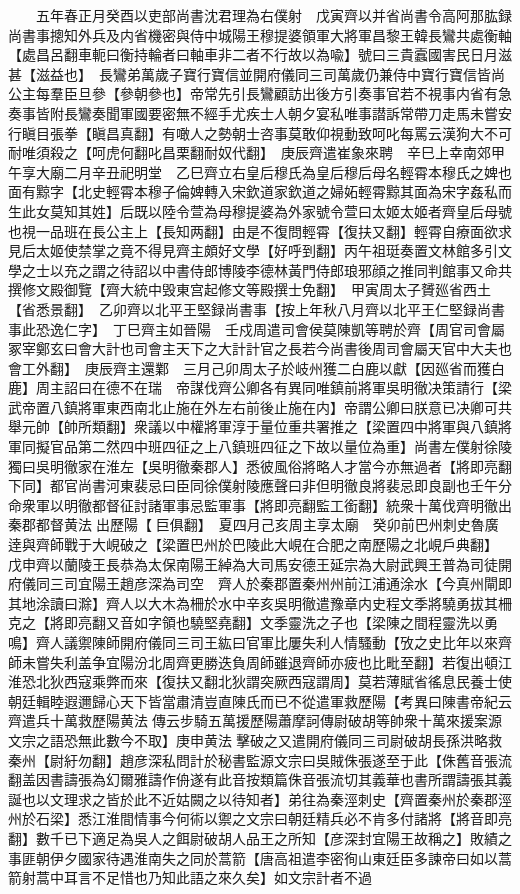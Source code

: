 　　五年春正月癸酉以吏部尚書沈君理為右僕射　戊寅齊以并省尚書令高阿那肱録尚書事摠知外兵及内省機密與侍中城陽王穆提婆領軍大將軍昌黎王韓長鸞共處衡軸【處昌呂翻車軛曰衡持輪者曰軸車非二者不行故以為喩】號曰三貴蠧國害民日月滋甚【滋益也】　長鸞弟萬歲子寶行寶信並開府儀同三司萬歲仍兼侍中寶行寶信皆尚公主每羣臣旦參【參朝參也】帝常先引長鸞顧訪出後方引奏事官若不視事内省有急奏事皆附長鸞奏聞軍國要密無不經手尤疾士人朝夕宴私唯事譛訴常帶刀走馬未嘗安行瞋目張拳【瞋昌真翻】有噉人之勢朝士咨事莫敢仰視動致呵叱每罵云漢狗大不可耐唯須殺之【呵虎何翻叱昌栗翻耐奴代翻】　庚辰齊遣崔象來聘　辛巳上幸南郊甲午享大廟二月辛丑祀明堂　乙巳齊立右皇后穆氏為皇后穆后母名輕霄本穆氏之婢也面有黥字【北史輕霄本穆子倫婢轉入宋欽道家欽道之婦妬輕霄黥其面為宋字姦私而生此女莫知其姓】后既以陸令萱為母穆提婆為外家號令萱曰太姬太姬者齊皇后母號也視一品班在長公主上【長知两翻】由是不復問輕霄【復扶又翻】輕霄自療面欲求見后太姬使禁掌之竟不得見齊主頗好文學【好呼到翻】丙午祖珽奏置文林館多引文學之士以充之謂之待詔以中書侍郎博陵李德林黃門侍郎琅邪顔之推同判館事又命共撰修文殿御覽【齊大統中毁東宫起修文等殿撰士免翻】　甲寅周太子贇廵省西土【省悉景翻】　乙卯齊以北平王堅録尚書事【按上年秋八月齊以北平王仁堅録尚書事此恐逸仁字】　丁巳齊主如晉陽　壬戍周遣司會侯莫陳凱等聘於齊【周官司會屬冢宰鄭玄曰會大計也司會主天下之大計計官之長若今尚書後周司會屬天官中大夫也會工外翻】　庚辰齊主還鄴　三月己卯周太子於岐州獲二白鹿以獻【因廵省而獲白鹿】周主詔曰在德不在瑞　帝謀伐齊公卿各有異同唯鎮前將軍吳明徹决策請行【梁武帝置八鎮將軍東西南北止施在外左右前後止施在内】帝謂公卿曰朕意已决卿可共舉元帥【帥所類翻】衆議以中權將軍淳于量位重共署推之【梁置四中將軍與八鎮將軍同擬官品第二然四中班四征之上八鎮班四征之下故以量位為重】尚書左僕射徐陵獨曰吳明徹家在淮左【吳明徹秦郡人】悉彼風俗將略人才當今亦無過者【將即亮翻下同】都官尚書河東裴忌曰臣同徐僕射陵應聲曰非但明徹良將裴忌即良副也壬午分命衆軍以明徹都督征討諸軍事忌監軍事【將即亮翻監工銜翻】統衆十萬伐齊明徹出秦郡都督黄法出歷陽【巨俱翻】　夏四月己亥周主享太廟　癸卯前巴州刺史魯廣逹與齊師戰于大峴破之【梁置巴州於巴陵此大峴在合肥之南歷陽之北峴戶典翻】　戊申齊以蘭陵王長恭為太保南陽王綽為大司馬安德王延宗為大尉武興王普為司徒開府儀同三司宜陽王趙彦深為司空　齊人於秦郡置秦州州前江浦通涂水【今真州閘即其地涂讀曰滁】齊人以大木為柵於水中辛亥吳明徹遣豫章内史程文季將驍勇拔其柵克之【將即亮翻又音如字領也驍堅堯翻】文季靈洗之子也【梁陳之間程靈洗以勇鳴】齊人議禦陳師開府儀同三司王紘曰官軍比屢失利人情騷動【攷之史比年以來齊師未嘗失利盖争宜陽汾北周齊更勝迭負周師雖退齊師亦疲也比毗至翻】若復出頓江淮恐北狄西寇乘弊而來【復扶又翻北狄謂突厥西寇謂周】莫若薄賦省徭息民養士使朝廷輯睦遐邇歸心天下皆當肅清豈直陳氏而已不從遣軍救歷陽【考異曰陳書帝紀云齊遣兵十萬救歷陽黄法傳云步騎五萬援歷陽蕭摩訶傳尉破胡等帥衆十萬來援案源文宗之語恐無此數今不取】庚申黄法擊破之又遣開府儀同三司尉破胡長孫洪略救秦州【尉紆勿翻】趙彦深私問計於秘書監源文宗曰吳賊侏張遂至于此【侏舊音張流翻盖因書譸張為幻爾雅譸作侜遂有此音按類篇侏音張流切其義華也書所謂譸張其義誕也以文理求之皆於此不近姑闕之以待知者】弟往為秦涇刺史【齊置秦州於秦郡涇州於石梁】悉江淮間情事今何術以禦之文宗曰朝廷精兵必不肯多付諸將【將音即亮翻】數千已下適足為吳人之餌尉破胡人品王之所知【彦深封宜陽王故稱之】敗績之事匪朝伊夕國家待遇淮南失之同於蒿箭【唐高祖遣李密徇山東廷臣多諫帝曰如以蒿箭射蒿中耳言不足惜也乃知此語之來久矣】如文宗計者不過